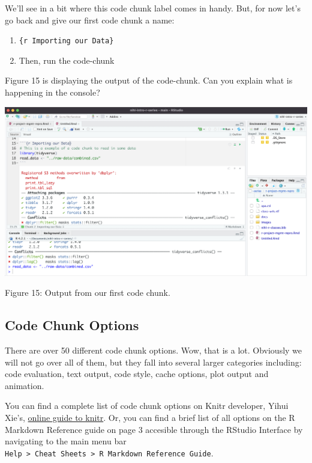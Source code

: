 \documentclass[
]{article}
\begin{document}
We'll see in a bit where this code chunk label comes in handy. But, for
now let's go back and give our first code chunk a name:

\begin{enumerate}
\def\labelenumi{\arabic{enumi}.}
\item
  \texttt{\{r\ Importing\ our\ Data\}}
\item
  Then, run the code-chunk
\end{enumerate}

Figure 15 is displaying the output of the code-chunk. Can you explain
what is happening in the console?

\includegraphics[width=6.5in,height=\textheight]{images/knit-02.png}

Figure 15: Output from our first code chunk.

\hypertarget{code-chunk-options}{%
\subsection{Code Chunk Options}\label{code-chunk-options}}

There are over 50 different code chunk options. Wow, that is a lot.
Obviously we will not go over all of them, but they fall into several
larger categories including: code evaluation, text output, code style,
cache options, plot output and animation.

You can find a complete list of code chunk options on Knitr developer,
Yihui Xie's, \href{https://yihui.org/knitr/options/}{online guide to
knitr}. Or, you can find a brief list of all options on the R Markdown
Reference guide on page 3 accesible through the RStudio Interface by
navigating to the main menu bar
\texttt{Help\ \textgreater{}\ Cheat\ Sheets\ \textgreater{}\ R\ Markdown\ Reference\ Guide}.
\end{document}
